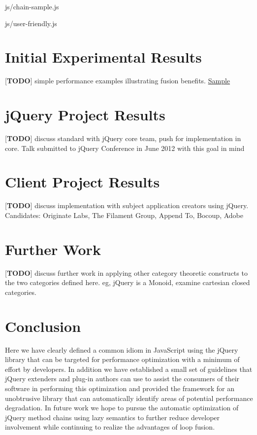 \documentclass[preprint]{sigplanconf}
\begin{document}
\begin{lstinputlisting}[
    language=JavaScript,
    caption={Sources of Html objects},
    label={lst:chain-sample}
]{js/chain-sample.js}
\begin{lstinputlisting}[
    language=JavaScript,
    caption={User friendly overhead},
    label={lst:user-friendly}
]{js/user-friendly.js}
\section{Initial Experimental Results}

[\textbf{TODO}] simple performance examples illustrating fusion benefits. \href{http://jsperf.com/lazy-loop-fusion-vs-traditional-method-chaning/5}{Sample}

\section{jQuery Project Results}

[\textbf{TODO}] discuss standard with jQuery core team, push for implementation in core. Talk submitted to jQuery Conference in June 2012 with this goal in mind

\section{Client Project Results}

[\textbf{TODO}] discuss implementation with subject application creators using jQuery. Candidates: Originate Labs, The Filament Group, Append To, Bocoup, Adobe

\section{Further Work}

[\textbf{TODO}] discuss further work in applying other category theoretic constructs to the two categories defined here. eg, jQuery is a Monoid, examine cartesian closed categories.

\section{Conclusion}

Here we have clearly defined a common idiom in JavaScript using the jQuery library that can be targeted for performance optimization with a minimum of effort by developers. In addition we have established a small set of guidelines that jQuery extenders and plug-in authors can use to assist the consumers of their software in performing this optimization and provided the framework for an unobtrusive library that can automatically identify areas of potential performance degradation. In future work we hope to pursue the automatic optimization of jQuery method chains using lazy semantics to further reduce developer involvement while continuing to realize the advantages of loop fusion.


\end{lstinputlisting}
\end{lstinputlisting}
\end{document}
